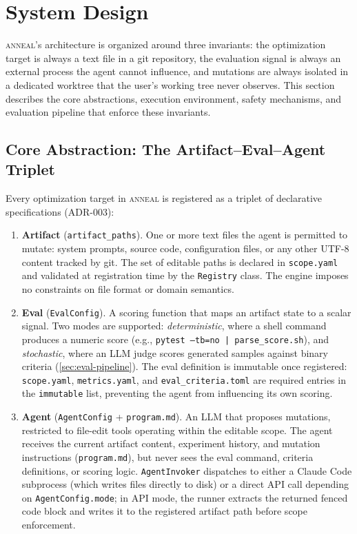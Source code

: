 \section{System Design}\label{sec:system-design}

\textsc{anneal}'s architecture is organized around three invariants: the optimization target is always a text file in a git repository, the evaluation signal is always an external process the agent cannot influence, and mutations are always isolated in a dedicated worktree that the user's working tree never observes.
This section describes the core abstractions, execution environment, safety mechanisms, and evaluation pipeline that enforce these invariants.

\subsection{Core Abstraction: The Artifact--Eval--Agent Triplet}\label{sec:triplet}

Every optimization target in \textsc{anneal} is registered as a triplet of declarative specifications (ADR-003):

\begin{enumerate}
    \item \textbf{Artifact} (\texttt{artifact\_paths}).
    One or more text files the agent is permitted to mutate: system prompts, source code, configuration files, or any other UTF-8 content tracked by git.
    The set of editable paths is declared in \texttt{scope.yaml} and validated at registration time by the \texttt{Registry} class.
    The engine imposes no constraints on file format or domain semantics.

    \item \textbf{Eval} (\texttt{EvalConfig}).
    A scoring function that maps an artifact state to a scalar signal.
    Two modes are supported: \emph{deterministic}, where a shell command produces a numeric score (e.g., \texttt{pytest --tb=no | parse\_score.sh}), and \emph{stochastic}, where an LLM judge scores generated samples against binary criteria (\cref{sec:eval-pipeline}).
    The eval definition is immutable once registered: \texttt{scope.yaml}, \texttt{metrics.yaml}, and \texttt{eval\_criteria.toml} are required entries in the \texttt{immutable} list, preventing the agent from influencing its own scoring.

    \item \textbf{Agent} (\texttt{AgentConfig} + \texttt{program.md}).
    An LLM that proposes mutations, restricted to file-edit tools operating within the editable scope.
    The agent receives the current artifact content, experiment history, and mutation instructions (\texttt{program.md}), but never sees the eval command, criteria definitions, or scoring logic.
    \texttt{AgentInvoker} dispatches to either a Claude Code subprocess (which writes files directly to disk) or a direct API call depending on \texttt{AgentConfig.mode}; in API mode, the runner extracts the returned fenced code block and writes it to the registered artifact path before scope enforcement.
\end{enumerate}

